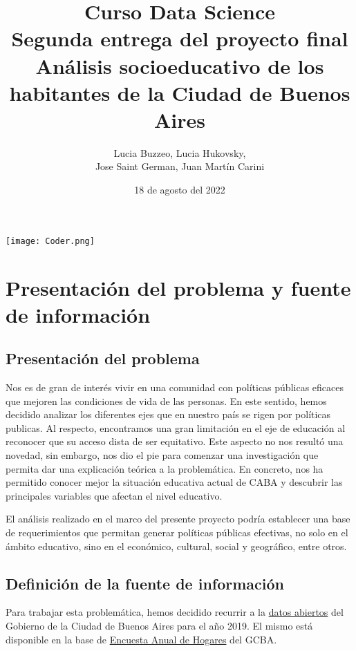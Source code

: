 \documentclass[a4paper]{article}
\title{Curso Data Science \\ \vspace{0.5cm} Segunda entrega del proyecto final\\ \vspace{0.5cm}
Análisis socioeducativo de los habitantes de la Ciudad de Buenos Aires}
\author{Lucia Buzzeo, Lucia Hukovsky,\\ Jose Saint German, Juan Martín Carini}
\date{18 de agosto del 2022}
\begin{document}
\maketitle

\begin{center}
    \texttt{[image: Coder.png]}
\end{center}

\thispagestyle{empty}

\newpage

\tableofcontents

\newpage

\section{Presentación del problema y fuente de información}

    \subsection{Presentación del problema}

        Nos es de gran de interés vivir en una comunidad con políticas públicas eficaces que mejoren las condiciones de vida de las personas. En este sentido, hemos decidido analizar los diferentes ejes que en nuestro país se rigen por políticas publicas. Al respecto, encontramos una gran limitación en el eje de educación al reconocer que su acceso dista de ser equitativo. Este aspecto no nos resultó una novedad, sin embargo, nos dio el pie para comenzar una investigación que permita dar una explicación teórica a la problemática. 
        En concreto, nos ha permitido conocer mejor la situación educativa actual de CABA y descubrir las principales variables que afectan el nivel educativo.
        
        El análisis realizado en el marco del presente proyecto podría establecer una base de requerimientos que permitan generar políticas públicas efectivas, no solo en el ámbito educativo, sino en el económico, cultural, social y geográfico, entre otros.

        \subsection{Definición de la fuente de información}

        Para trabajar esta problemática, hemos decidido recurrir a la \href{https://www.estadisticaciudad.gob.ar/eyc/?page_id=702}{datos abiertos} del Gobierno de la Ciudad de Buenos Aires para el año 2019. El mismo está disponible en la base de \href{https://data.buenosaires.gob.ar/dataset/encuesta-anual-hogares/resource/3a45c563-396d-42de-ba93-8a93729e0723}{Encuesta Anual de Hogares} del GCBA.
\end{document}

